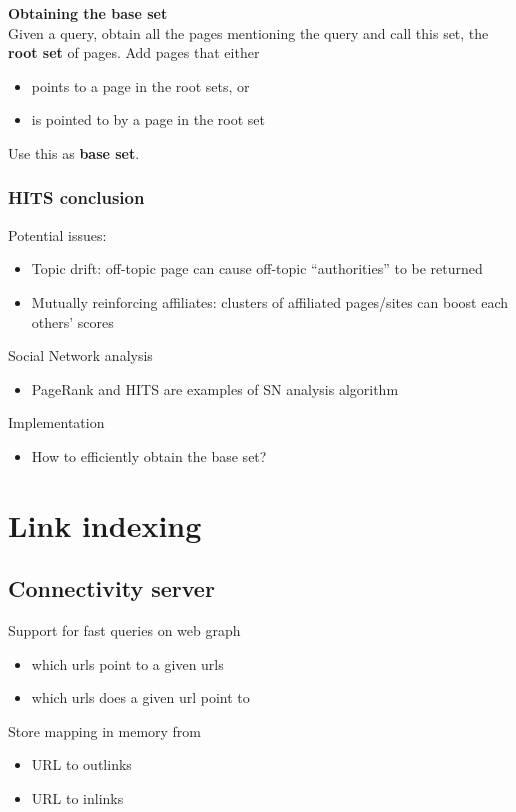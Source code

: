 \textbf{Obtaining the base set} \\
Given a query, obtain all the pages mentioning the query and call this
set, the \textbf{root set} of pages. Add pages that either
\begin{itemize}
\item points to a page in the root sets, or
\item is pointed to by a page in the root set
\end{itemize}
Use this as \textbf{base set}.

\subsubsection{HITS conclusion}

Potential issues:
\begin{itemize}
\item Topic drift: off-topic page can cause off-topic ``authorities''
  to be returned
\item Mutually reinforcing affiliates: clusters of affiliated
  pages/sites can boost each others' scores
\end{itemize}

Social Network analysis
\begin{itemize}
\item PageRank and HITS are examples of SN analysis algorithm
\end{itemize}

Implementation
\begin{itemize}
\item How to efficiently obtain the base set?
\end{itemize}

\section{Link indexing}

\subsection{Connectivity server}
Support for fast queries on web graph
\begin{itemize}
\item which urls point to a given urls
\item which urls does a given url point to
\end{itemize}

Store mapping in memory from
\begin{itemize}
\item URL to outlinks
\item URL to inlinks
\end{itemize}

